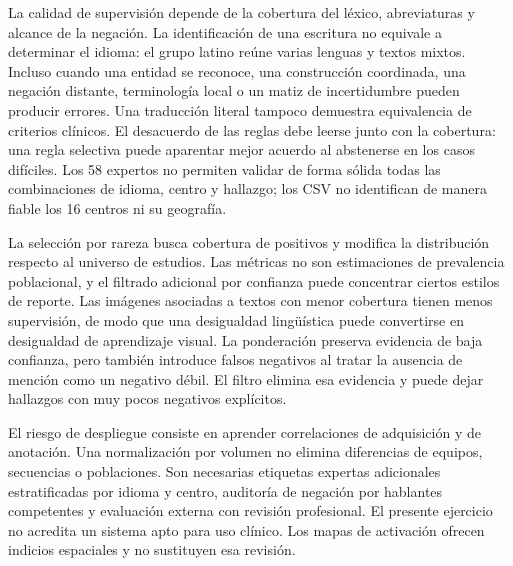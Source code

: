 La calidad de supervisión depende de la cobertura del léxico, abreviaturas y alcance de la negación.
La identificación de una escritura no equivale a determinar el idioma: el grupo latino reúne varias
lenguas y textos mixtos. Incluso cuando una entidad se reconoce, una construcción coordinada,
una negación distante, terminología local o un matiz de incertidumbre pueden producir errores.
Una traducción literal tampoco demuestra equivalencia de criterios clínicos. El desacuerdo de las reglas
debe leerse junto con la cobertura: una regla selectiva puede aparentar mejor acuerdo al abstenerse
en los casos difíciles. Los 58 expertos no permiten validar de forma sólida todas las combinaciones
de idioma, centro y hallazgo; los CSV no identifican de manera fiable los 16 centros ni su geografía.

La selección por rareza busca cobertura de positivos y modifica la distribución respecto al universo
de estudios. Las métricas no son estimaciones de prevalencia poblacional, y el filtrado adicional por
confianza puede concentrar ciertos estilos de reporte. Las imágenes asociadas a textos con menor
cobertura tienen menos supervisión, de modo que una desigualdad lingüística puede convertirse en
desigualdad de aprendizaje visual. La ponderación preserva evidencia de baja confianza, pero también
introduce falsos negativos al tratar la ausencia de mención como un negativo débil. El filtro elimina
esa evidencia y puede dejar hallazgos con muy pocos negativos explícitos.

El riesgo de despliegue consiste en aprender correlaciones de adquisición y de anotación. Una
normalización por volumen no elimina diferencias de equipos, secuencias o poblaciones. Son necesarias
etiquetas expertas adicionales estratificadas por idioma y centro, auditoría de negación por hablantes
competentes y evaluación externa con revisión profesional. El presente ejercicio no acredita un sistema
apto para uso clínico. Los mapas de activación ofrecen indicios espaciales y no sustituyen esa revisión.
